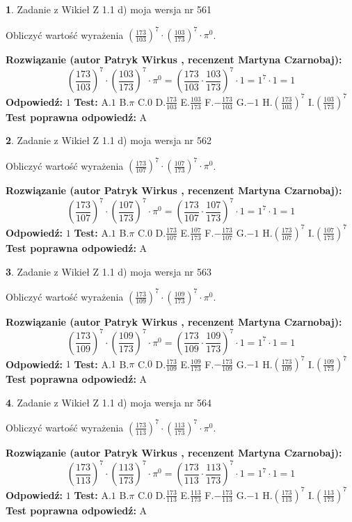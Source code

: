 \documentclass[12pt, a4paper]{article}
\theoremstyle{definition} %
\newtheorem{zad}{}
\newcommand{\zadStart}[1]{\begin{zad}#1\newline}
\newcommand{\zadStop}{\end{zad}}
\newcommand{\rozwStart}[2]{\noindent \textbf{Rozwiązanie (autor #1 , recenzent #2): }\newline}
\newcommand{\rozwStop}{\newline}
\newcommand{\odpStart}{\noindent \textbf{Odpowiedź:}\newline}
\newcommand{\odpStop}{\newline}
\newcommand{\testStart}{\noindent \textbf{Test:}\newline}
\newcommand{\testStop}{\newline}
\newcommand{\kluczStart}{\noindent \textbf{Test poprawna odpowiedź:}\newline}
\newcommand{\kluczStop}{\newline}
\begin{document}
\zadStart{Zadanie z Wikieł Z 1.1 d) moja wersja nr 561}

Obliczyć wartość wyrażenia $(\frac{173}{103})^{7} \cdot (\frac{103}{173})^{7} \cdot \pi^{0}$.
\zadStop
\rozwStart{Patryk Wirkus}{Martyna Czarnobaj}
$$(\frac{173}{103})^{7} \cdot (\frac{103}{173})^{7} \cdot \pi^{0} = (\frac{173}{103} \cdot \frac{103}{173})^{7} \cdot 1 = 1^{7} \cdot 1 = 1$$
\rozwStop
\odpStart
$1$
\odpStop
\testStart
A.$1$ B.$\pi$ C.$0$ D.$\frac{173}{103}$ E.$\frac{103}{173}$
F.$-\frac{173}{103}$ G.$-1$
H.$(\frac{173}{103})^{7}$
I.$(\frac{103}{173})^{7}$
\testStop
\kluczStart
A
\kluczStop



\zadStart{Zadanie z Wikieł Z 1.1 d) moja wersja nr 562}

Obliczyć wartość wyrażenia $(\frac{173}{107})^{7} \cdot (\frac{107}{173})^{7} \cdot \pi^{0}$.
\zadStop
\rozwStart{Patryk Wirkus}{Martyna Czarnobaj}
$$(\frac{173}{107})^{7} \cdot (\frac{107}{173})^{7} \cdot \pi^{0} = (\frac{173}{107} \cdot \frac{107}{173})^{7} \cdot 1 = 1^{7} \cdot 1 = 1$$
\rozwStop
\odpStart
$1$
\odpStop
\testStart
A.$1$ B.$\pi$ C.$0$ D.$\frac{173}{107}$ E.$\frac{107}{173}$
F.$-\frac{173}{107}$ G.$-1$
H.$(\frac{173}{107})^{7}$
I.$(\frac{107}{173})^{7}$
\testStop
\kluczStart
A
\kluczStop



\zadStart{Zadanie z Wikieł Z 1.1 d) moja wersja nr 563}

Obliczyć wartość wyrażenia $(\frac{173}{109})^{7} \cdot (\frac{109}{173})^{7} \cdot \pi^{0}$.
\zadStop
\rozwStart{Patryk Wirkus}{Martyna Czarnobaj}
$$(\frac{173}{109})^{7} \cdot (\frac{109}{173})^{7} \cdot \pi^{0} = (\frac{173}{109} \cdot \frac{109}{173})^{7} \cdot 1 = 1^{7} \cdot 1 = 1$$
\rozwStop
\odpStart
$1$
\odpStop
\testStart
A.$1$ B.$\pi$ C.$0$ D.$\frac{173}{109}$ E.$\frac{109}{173}$
F.$-\frac{173}{109}$ G.$-1$
H.$(\frac{173}{109})^{7}$
I.$(\frac{109}{173})^{7}$
\testStop
\kluczStart
A
\kluczStop



\zadStart{Zadanie z Wikieł Z 1.1 d) moja wersja nr 564}

Obliczyć wartość wyrażenia $(\frac{173}{113})^{7} \cdot (\frac{113}{173})^{7} \cdot \pi^{0}$.
\zadStop
\rozwStart{Patryk Wirkus}{Martyna Czarnobaj}
$$(\frac{173}{113})^{7} \cdot (\frac{113}{173})^{7} \cdot \pi^{0} = (\frac{173}{113} \cdot \frac{113}{173})^{7} \cdot 1 = 1^{7} \cdot 1 = 1$$
\rozwStop
\odpStart
$1$
\odpStop
\testStart
A.$1$ B.$\pi$ C.$0$ D.$\frac{173}{113}$ E.$\frac{113}{173}$
F.$-\frac{173}{113}$ G.$-1$
H.$(\frac{173}{113})^{7}$
I.$(\frac{113}{173})^{7}$
\testStop
\kluczStart
A
\kluczStop
\end{document}
